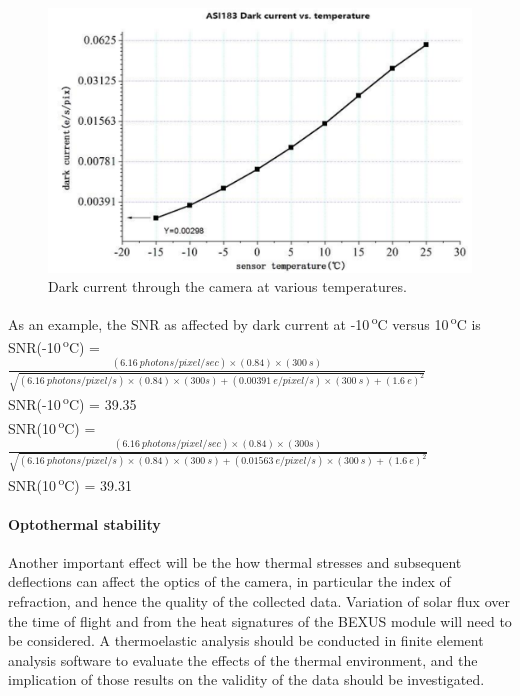 	\begin{figure}[h!]
    \centering
    \includegraphics[scale=0.8]{4-experiment-design/img/mechanical/darkcurrent.png}
    	\caption{Dark current through the camera at various temperatures.}
	\label{fig:darkcurrent}
	\end{figure}

As an example, the SNR as affected by dark current at -10\,\textsuperscript{o}C versus 10\,\textsuperscript{o}C is\\

 SNR(-10\,\textsuperscript{o}C) =  $\frac{(\SI{6.16}{photons \per pixel \per sec})\times (0.84)\times (\SI{300}{s})}{\sqrt{(\SI{6.16}{photons \per pixel \per s})\times (0.84)\times (300s)+(\SI{0.00391}{e \per pixel \per s})\times (\SI{300}{s})+(\SI{1.6}{e})^2}}$ \\
 
 SNR(-10\,\textsuperscript{o}C) = 39.35\\
 
 SNR(10\,\textsuperscript{o}C) =  $\frac{(\SI{6.16}{photons \per pixel \per sec})\times (0.84)\times (300s)}{\sqrt{(\SI{6.16}{photons \per pixel \per s})\times (0.84)\times (\SI{300}{s})+(\SI{0.01563}{e \per pixel \per s})\times (\SI{300}{s})+(\SI{1.6}{e})^2}}$ \\

 SNR(10\,\textsuperscript{o}C) = 39.31\\


\paragraph{Optothermal stability}
Another important effect will be the how thermal stresses and subsequent deflections can affect the optics of the camera, in particular the index of refraction, and hence the quality of the collected data. Variation of solar flux over the time of flight and from the heat signatures of the BEXUS module will need to be considered. A thermoelastic analysis should be conducted in finite element analysis software to evaluate the effects of the thermal environment, and the implication of those results on the validity of the data should be investigated. \

